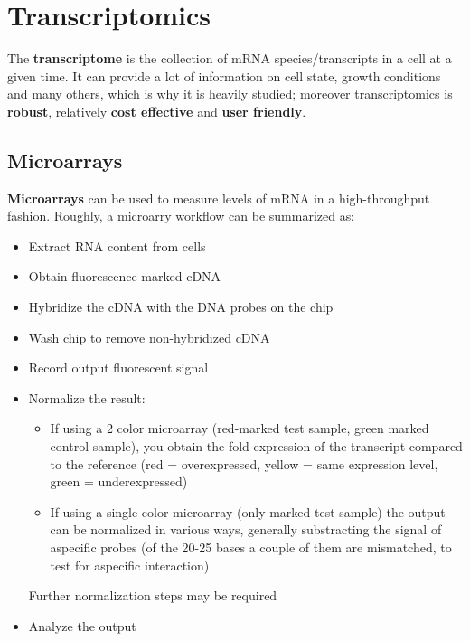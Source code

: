   \section{Transcriptomics}
    The \textbf{transcriptome} is the collection of mRNA species/transcripts in a cell at a given time. It can provide a lot of information on cell state, growth conditions and many others, which is why it is heavily studied; moreover transcriptomics is \textbf{robust}, relatively \textbf{cost effective} and \textbf{user friendly}.
    
    \subsection{Microarrays}
      \textbf{Microarrays} can be used to measure levels of mRNA in a high-throughput fashion.
      Roughly, a microarry workflow can be summarized as:
      \begin{itemize}
        \item Extract RNA content from cells
        \item Obtain fluorescence-marked cDNA
        \item Hybridize the cDNA with the DNA probes on the chip 
        \item Wash chip to remove non-hybridized cDNA
        \item Record output fluorescent signal
        \item Normalize the result:
        \begin{itemize}
          \item If using a 2 color microarray (red-marked test sample, green marked control sample), you obtain the fold expression of the transcript compared to the reference (red = overexpressed, yellow = same expression level, green = underexpressed)
          \item If using a single color microarray (only marked test sample) the output can be normalized in various ways, generally substracting the signal of aspecific probes (of the 20-25 bases a couple of them are mismatched, to test for aspecific interaction)
        \end{itemize}
        Further normalization steps may be required
        \item Analyze the output
      \end{itemize}

